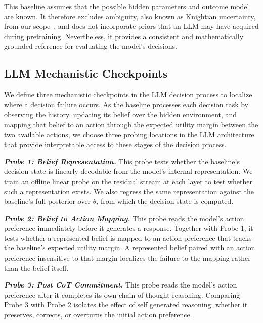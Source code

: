 \documentclass[letterpaper]{article} %
\begin{document}
This baseline assumes that the possible hidden parameters and outcome
model are known. It therefore excludes ambiguity, also known as
Knightian uncertainty, from our scope~\citep{TODO_ELLSBERG}, and does not
incorporate priors that an LLM may have acquired during pretraining.
Nevertheless, it provides a consistent and mathematically grounded
reference for evaluating the model's decisions.

\subsection{LLM Mechanistic Checkpoints}

We define three mechanistic checkpoints in the LLM decision process to
localize where a decision failure occurs. As the
baseline processes each decision task by observing the history, updating its belief over the hidden environment, and mapping that
belief to an action through the expected utility margin between the two
available actions, we choose three probing locations in the LLM
architecture that provide interpretable access to these stages of the
decision process.

\textbf{\textit{Probe 1: Belief Representation.}}
This probe tests whether the baseline's decision state is linearly
decodable from the model's internal representation. We train an offline
linear probe on the residual stream at each layer to test whether such a
representation exists. We also regress the same representation against the
baseline's full posterior over \(\theta\), from which the decision state is
computed.

\textbf{\textit{Probe 2: Belief to Action Mapping.}}
This probe reads the model's action preference immediately before it
generates a response. Together with Probe 1, it tests whether a represented
belief is mapped to an action preference that tracks the baseline's expected
utility margin. A represented belief paired with an action preference
insensitive to that margin localizes the failure to the mapping rather than
the belief itself.

\textbf{\textit{Probe 3: Post CoT Commitment.}}
This probe reads the model's action preference after it completes its own
chain of thought reasoning. Comparing Probe 3 with Probe 2 isolates the
effect of self generated reasoning: whether it preserves, corrects, or
overturns the initial action preference.

\subsection{}
\end{document}
